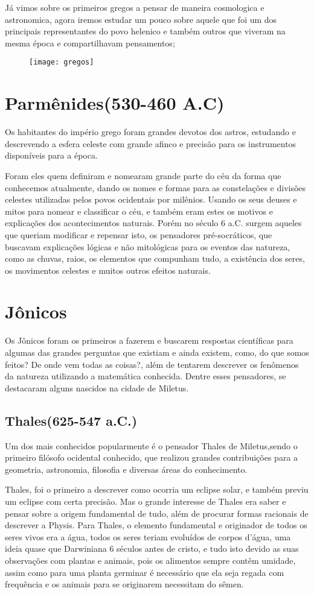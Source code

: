 Já vimos sobre os primeiros gregos a pensar de maneira cosmologica e astronomica, agora iremos estudar um pouco sobre aquele que foi um dos principais representantes do povo helenico e também outros que viveram na mesma época e compartilhavam pensamentos;

\begin{figure}[ht!]
\texttt{[image: gregos]}
\end{figure}
\section*{Parmênides(530-460 A.C)}
Os habitantes do império grego foram grandes devotos dos astros, estudando e descrevendo a esfera celeste com grande afinco e precisão para os instrumentos disponíveis para a época.

Foram eles quem definiram e nomearam grande parte do céu da forma que conhecemos atualmente, dando os nomes e formas para as constelações e divisões celestes utilizadas pelos povos ocidentais por milênios. Usando os seus deuses e mitos para nomear e classificar o céu, e também eram estes os motivos e explicações dos acontecimentos naturais. Porém no século 6 a.C. surgem aqueles que queriam modificar e repensar isto, os pensadores pré-socráticos, que buscavam explicações lógicas e não mitológicas para os eventos das natureza, como as chuvas, raios, os elementos que compunham tudo, a existência dos seres, os movimentos celestes e muitos outros efeitos naturais.
\section*{Jônicos}
Os Jônicos foram os primeiros a fazerem e buscarem respostas científicas para algumas das grandes perguntas que existiam e ainda existem, como, do que somos feitos? De onde vem todas as coisas?, além de tentarem descrever os fenômenos da natureza utilizando a matemática conhecida. Dentre esses pensadores, se destacaram alguns nascidos na cidade de Miletus.
\subsection*{Thales(625-547 a.C.)}
Um dos mais conhecidos popularmente é o pensador Thales de Miletus,sendo o primeiro filósofo ocidental conhecido, que realizou grandes contribuições para a geometria, astronomia, filosofia e diversas áreas do conhecimento.

Thales, foi o primeiro a descrever como ocorria um eclipse solar, e também previu um eclipse com certa precisão. Mas o grande interesse de Thales era saber e pensar sobre a origem fundamental de tudo, além de procurar formas racionais de descrever a Physis. Para Thales, o elemento fundamental e originador de todos os seres vivos era a água, todos os seres teriam evoluídos de corpos d'água, uma ideia quase que Darwiniana 6 séculos antes de cristo, e tudo isto devido as suas observações com plantas e animais, pois os alimentos sempre contêm umidade, assim como para uma planta germinar é necessário que ela seja regada com frequência e os animais para se originarem necessitam do sêmen.

